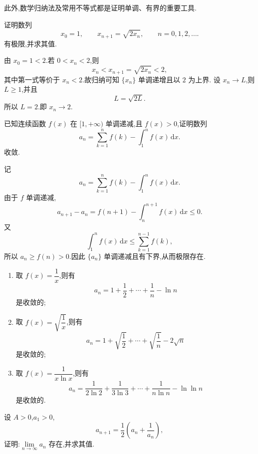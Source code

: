 此外,数学归纳法及常用不等式都是证明单调、有界的重要工具.

\begin{example}
  证明数列
  \[
    x_0=1,\qquad x_{n+1}=\sqrt{2x_n},\qquad n=0,1,2,\ldots.
  \]
  有极限,并求其值.
\end{example}
\exampleblank

\begin{solution}
  由 $x_0=1<2$.若 $0<x_n<2$,则
  \[
    x_n<x_{n+1}=\sqrt{2x_n}<2,
  \]
  其中第一式等价于 $x_n<2$.故归纳可知 $\{x_n\}$ 单调递增且以 $2$ 为上界.
  设 $x_n\to L$,则 $L\geq1$,并且
  \[
    L=\sqrt{2L}.
  \]
  所以 $L=2$.即 $x_n\to2$.
\end{solution}

\begin{example}
  已知连续函数 $f(x)$ 在 $\lbrack 1,+\infty)$ 单调递减,且 $f(x)>0$,证明数列
  \[
    a_n=\sum\limits_{k=1}^n f(k)-\int_1^n f(x)\,\mathrm{d}x.
  \]
  收敛.
\end{example}
\exampleblank

\begin{solution}
  记
  \[
    a_n=\sum\limits_{k=1}^n f(k)-\int_1^n f(x)\,\mathrm{d}x.
  \]
  由于 $f$ 单调递减,
  \[
    a_{n+1}-a_n
    =f(n+1)-\int_n^{n+1}f(x)\,\mathrm{d}x\leq0.
  \]
  又
  \[
    \int_1^n f(x)\,\mathrm{d}x
    \leq\sum\limits_{k=1}^{n-1}f(k),
  \]
  所以 $a_n\geq f(n)>0$.因此 $\{a_n\}$ 单调递减且有下界,从而极限存在.
\end{solution}

\begin{remark}
  \begin{enumerate}
    \item 取 $f(x)=\dfrac{1}{x}$,则有
          \[
            a_n=1+\dfrac{1}{2}+\cdots+\dfrac{1}{n}-\ln n
          \]
          是收敛的;
    \item 取 $f(x)=\sqrt{\dfrac{1}{x}}$,则有
          \[
            a_n=1+\sqrt{\dfrac{1}{2}}+\cdots+\sqrt{\dfrac{1}{n}}-2\sqrt n
          \]
          是收敛的;
    \item 取 $f(x)=\dfrac{1}{x\ln x}$,则有
          \[
            a_n=\dfrac{1}{2\ln2}+\dfrac{1}{3\ln3}+\cdots+\dfrac{1}{n\ln n}-\ln\ln n
          \]
          是收敛的.
  \end{enumerate}
\end{remark}

\begin{example}
  设 $A>0$,$a_1>0$,
  \[
    a_{n+1}=\dfrac{1}{2}\left(a_n+\dfrac{1}{a_n}\right),
  \]
  证明:$\displaystyle \lim\limits_{n\to\infty}a_n$ 存在,并求其值.
\end{example}
\exampleblank

